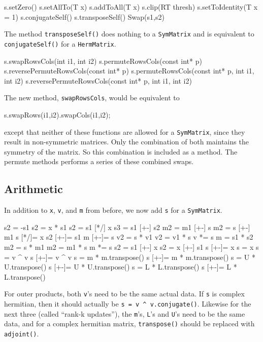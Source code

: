 \documentclass[twoside,letterpaper,11pt]{article}
\renewcommand{\tt}[1]{{\lstinline {#1}}}
\begin{document}
\begin{tmvcode}
s.setZero()
s.setAllTo(T x)
s.addToAll(T x)
s.clip(RT thresh)
s.setToIdentity(T x = 1)
s.conjugateSelf()
s.transposeSelf()
Swap(s1,s2)
\end{tmvcode}
The method \tt{transposeSelf()} does nothing to a \tt{SymMatrix} and is equivalent to
\tt{conjugateSelf()} for a \tt{HermMatrix}.
\begin{tmvcode}
s.swapRowsCols(int i1, int i2)
s.permuteRowsCols(const int* p)
s.reversePermuteRowsCols(const int* p)
s.permuteRowsCols(const int* p, int i1, int i2)
s.reversePermuteRowsCols(const int* p, int i1, int i2)
\end{tmvcode}
The new method, \tt{swapRowsCols}, would be equivalent to 
\begin{tmvcode}
s.swapRows(i1,i2).swapCols(i1,i2);
\end{tmvcode}
except that neither of these functions are allowed for a \tt{SymMatrix}, since 
they result in non-symmetric matrices.  Only the combination of both
maintains the symmetry of the matrix.  So this combination is included as
a method.  The permute methods performs a series of these
combined swaps.
\vspace{12pt}

\subsection{Arithmetic}
\label{SymMatrix_Arithmetic}

In addition to \tt{x}, \tt{v}, and \tt{m} from before,
we now add \tt{s} for a \tt{SymMatrix}.

\begin{tmvcode}
s2 = -s1
s2 = x * s1
s2 = s1 [*/] x
s3 = s1 [+-] s2
m2 = m1 [+-] s
m2 = s [+-] m1
s [*/]= x
s2 [+-]= s1
m [+-]= s
v2 = s * v1
v2 = v1 * s
v *= s
m = s1 * s2
m2 = s * m1
m2 = m1 * s
m *= s
s2 = s1 [+-] x
s2 = x [+-] s1
s [+-]= x
s = x
s = v ^ v
s [+-]= v ^ v
s = m * m.transpose()
s [+-]= m * m.transpose()
s = U * U.transpose()
s [+-]= U * U.transpose()
s = L * L.transpose()
s [+-]= L * L.transpose()
\end{tmvcode}
For outer products, both \tt{v}'s need to be the same actual data.  If \tt{s}
is complex hermitian, then it should actually be 
\tt{s = v ^ v.conjugate()}.
Likewise for the next three (called ``rank-k updates''), the \tt{m}'s, \tt{L}'s and
\tt{U}'s need to be the
same data, and for a complex hermitian matrix, \tt{transpose()}
should be replaced with \tt{adjoint()}.
\end{document}
